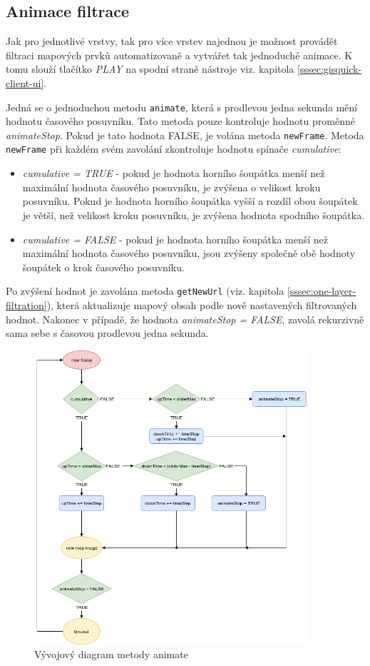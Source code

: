 \subsection{Animace filtrace}
\label{sssec:animation}

Jak pro jednotlivé vrstvy, tak pro více vrstev najednou je možnost
provádět filtraci mapových prvků automatizovaně a vytvářet tak
jednoduché animace. K tomu slouží tlačítko \textit{PLAY} na spodní
straně nástroje viz. kapitola \ref{sssec:gisquick-client-ui}.

Jedná se o jednoduchou metodu \verb|animate|, která s prodlevou jedna
sekunda mění hodnotu časového posuvníku. Tato metoda pouze kontroluje
hodnotu proměnné \textit{animateStop}. Pokud je tato hodnota FALSE, je
volána metoda \verb|newFrame|. Metoda \verb|newFrame| při každém svém
zavolání zkontroluje hodnotu spínače \textit{cumulative}:
\begin{itemize}
\item\textit{cumulative = TRUE} - pokud je hodnota horního šoupátka
menší než maximální hodnota časového posuvníku, je zvýšena o velikost
kroku posuvníku. Pokud je hodnota horního šoupátka vyšší a rozdíl obou
šoupátek je větší, než velikost kroku posuvníku, je zvýšena hodnota
spodního šoupátka.
\item\textit{cumulative = FALSE} - pokud je hodnota horního šoupátka
menší než maximální hodnota časového posuvníku, jsou zvýšeny
společně obě hodnoty šoupátek o krok časového posuvníku.
\end{itemize}
Po zvýšení hodnot je zavolána metoda \verb|getNewUrl| (viz. kapitola
\ref{sssec:one-layer-filtration}), která aktualizuje mapový obsah podle
nově nastavených filtrovaných hodnot. Nakonec v případě, že hodnota
\textit{animateStop = FALSE}, zavolá rekurzivně sama sebe s časovou
prodlevou jedna sekunda.

\begin{figure}[h!]
\centering
\includegraphics[width=0.9\textwidth]{../img/animate.png}
\caption{Vývojový diagram metody animate}
\label{fig:animate-chart}
\end{figure}

